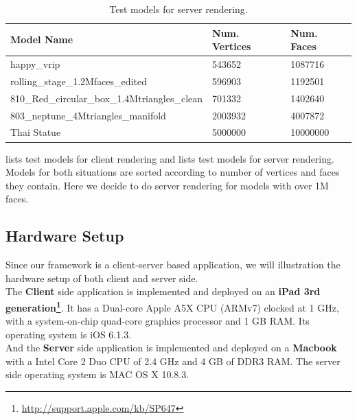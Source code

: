 \begin{table}
\begin{center}
    \begin{tabular}{|	p{7.5cm}	|	l	|	l	|}
    \hline	
    	\textbf{Model Name} 						& \textbf{Num. Vertices} 	& \textbf{Num. Faces}	\\ \hline
    	happy\_vrip							&543652			&1087716		\\ \hline
	rolling\_stage\_1.2Mfaces\_edited			&596903			&1192501		\\ \hline
	810\_Red\_circular\_box\_1.4Mtriangles\_clean	&701332			&1402640		\\ \hline
	803\_neptune\_4Mtriangles\_manifold		&2003932			&4007872		\\ \hline
	Thai Statue							&5000000			&10000000	\\ \hline
    \end{tabular}
    \caption{Test models for server rendering.}
    \label{table:modelsserverrendering}
\end{center}
\end{table}

 lists test models for client rendering and  lists test models for server rendering. Models for both situations are sorted according to number of vertices and faces they contain. Here we decide to do server rendering for models with over 1M faces. 

\subsection{Hardware Setup}
Since our framework is a client-server based application, we will illustration the hardware setup of both client and server side. \\

The \textbf{Client} side application is implemented and deployed on an \textbf{iPad 3rd generation\footnote{\label{ipad3rd}\url{http://support.apple.com/kb/SP647}}}. It has a Dual-core Apple A5X CPU (ARMv7) clocked at 1 GHz, with a system-on-chip quad-core graphics processor and 1 GB RAM. Its operating system is iOS 6.1.3. \\

And the \textbf{Server} side application is implemented and deployed on a \textbf{Macbook} with a Intel Core 2 Duo CPU of 2.4 GHz and 4 GB of DDR3 RAM. The server side operating system is MAC OS X 10.8.3. \\

